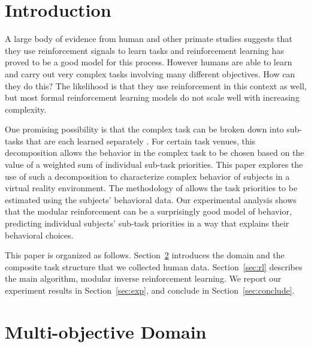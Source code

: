 \section{Introduction}

A large body of evidence from human and other primate studies 
suggests that they use reinforcement signals to learn tasks and reinforcement 
learning has proved to be a good model for this process.
However humans are able to learn and carry out very complex tasks involving 
many different objectives. 
How can they do this? The likelihood is that they use reinforcement in this 
context as well, but most formal reinforcement learning models do not scale 
well with increasing complexity.

One promising possibility is that the complex task can be broken down into 
sub-tasks that are each learned separately \cite{sprague2003multiple,
rothkopf2013modular, dietterich2000hierarchical}. 
For certain task venues, this decomposition allows the behavior in the complex 
task to be chosen based on the value of a weighted sum of individual sub-task priorities.
This paper explores the use of such a decomposition to characterize complex
behavior of subjects in a virtual reality environment. The methodology of
\cite{rothkopf2013modular} allows the task priorities to be estimated using the
subjects' behavioral data. Our experimental analysis shows that the modular reinforcement can be a 
surprisingly good model of behavior, predicting individual subjects' sub-task 
priorities in a way that explains their behavioral choices.

This paper is organized as follows. Section~\ref{sec:domain} introduces the
domain and the composite task structure that we collected human data. Section~\ref{sec:rl}
describes the main algorithm, modular inverse reinforcement learning. We report
our experiment results in Section~\ref{sec:exp}, and conclude in
Section~\ref{sec:conclude}.

\section{Multi-objective Domain}
\label{sec:domain}

